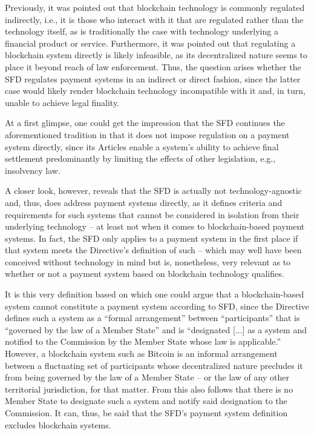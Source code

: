 Previously, it was pointed out that blockchain technology is commonly regulated indirectly, i.e., it is those who interact with it that are regulated rather than the technology itself, as is traditionally the case with technology underlying a financial product or service.
Furthermore, it was pointed out that regulating a blockchain system directly is likely infeasible, as its decentralized nature seems to place it beyond reach of law enforcement.
Thus, the question arises whether the SFD regulates payment systems in an indirect or direct fashion, since the latter case would likely render blockchain technology incompatible with it and, in turn, unable to achieve legal finality.

At a first glimpse, one could get the impression that the SFD continues the aforementioned tradition in that it does not impose regulation on a payment system directly, since its Articles enable a system's ability to achieve final settlement predominantly by limiting the effects of other legislation, e.g., insolvency law.

A closer look, however, reveals that the SFD is actually not technology-agnostic and, thus, does address payment systems directly, as it defines criteria and requirements for such systems that cannot be considered in isolation from their underlying technology -- at least not when it comes to blockchain-based payment systems.
In fact, the SFD only applies to a payment system in the first place if that system meets the Directive's definition of such \autocite[Article 2(a)]{eu1998sfd} -- which may well have been conceived without technology in mind but is, nonetheless, very relevant as to whether or not a payment system based on blockchain technology qualifies.

It is this very definition based on which one could argue that a blockchain-based system cannot constitute a payment system according to SFD, since the Directive defines such a system as a ``formal arrangement'' between ``participants'' that is ``governed by the law of a Member State'' and is ``designated [...] as a system and notified to the Commission by the Member State whose law is applicable.'' \autocite{eu1998sfd}
However, a blockchain system such as Bitcoin is an informal arrangement between a fluctuating set of participants whose decentralized nature precludes it from being governed by the law of a Member State -- or the law of any other territorial jurisdiction, for that matter.
From this also follows that there is no Member State to designate such a system and notify said designation to the Commission.
It can, thus, be said that the SFD's payment system definition excludes blockchain systems.

